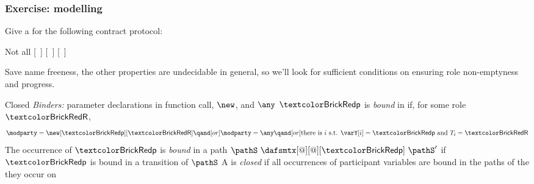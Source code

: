 \begin{frame}
  \frametitle{Exercise: modelling}
  Give a \modelname for the following contract protocol:

\end{frame}

\begin{frame}[t]{Not all \modelnames {}}
  [\ ]
  [\ ]
  [\ ]

  \vpause

  Save name freeness, the other properties are undecidable in general,
  so we'll look for sufficient conditions on \modelnames ensuring role
  non-emptyness and progress.
\end{frame}

\begin{frame}{Closed \modelnames}
  \emph{Binders:} parameter declarations in function call, $\new$, and $\any$
  \vpause
  $\partyP$ is \emph{bound} in \dafsmtx if, for some role $\roleR$,
  \[
	 \modparty = \new[\partyP][\roleR] \qand[or]
	 \modparty = \any \qand[or]
	 \text{there is } i \text{ s.t. } \varY[i] = \partyP \text{ and } T_i = \roleR
  \]
  \vpause
  The occurrence of $\partyP$ is \emph{bound} in a path
  $\pathS \ \dafsmtx[@][@][\partyP] \ \pathS'$ if $\partyP$ is bound in a
  transition of $\pathS$
  \vpause
  A \modelname is \emph{closed} if all occurrences of participant
  variables are bound in the paths of the \modelname they occur on
\end{frame}

